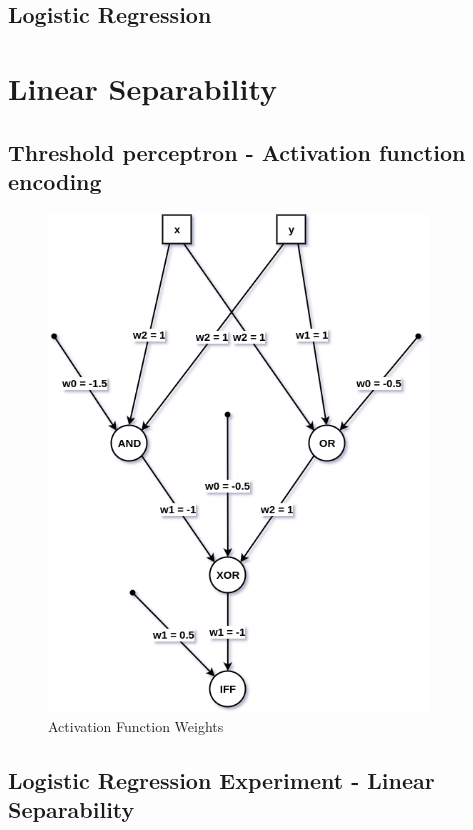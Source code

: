\documentclass[a4paper]{article}
\begin{document}
\newpage

\subsection{Logistic Regression}

\newpage

\section{Linear Separability}

\subsection{Threshold perceptron - Activation function encoding}
\begin{figure}[h]
    \centering
    \includegraphics[width=0.9\textwidth]{images/activation_functions.png}
    \caption{Activation Function Weights}
    \label{fig_activation_function_weights}
\end{figure}

\newpage

\subsection{Logistic Regression Experiment - Linear Separability}
\end{document}
